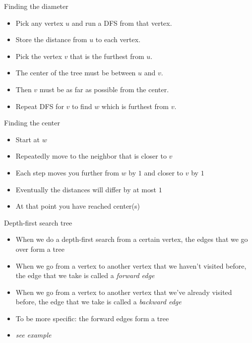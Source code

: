 \documentclass{beamer}
\begin{document}
\begin{frame}[plain]{Finding the diameter}
    \begin{itemize}
        \item Pick any vertex $u$ and run a DFS from that vertex.
        \item Store the distance from $u$ to each vertex.
        \item Pick the vertex $v$ that is the furthest from $u$.
        \item The center of the tree must be between $u$ and $v$.
        \item Then $v$ must be as far as possible from the center.
        \item Repeat DFS for $v$ to find $w$ which is furthest from $v$.
    \end{itemize}
\end{frame}

\begin{frame}[plain]{Finding the center}
    \begin{itemize}
        \item Start at $w$
        \item Repeatedly move to the neighbor that is closer to $v$
        \item Each step moves you further from $w$ by $1$ and closer to $v$ by $1$
        \item Eventually the distances will differ by at most $1$
        \item At that point you have reached center(s)
    \end{itemize}
\end{frame}

\begin{frame}[plain]{Depth-first search tree}
    \vspace{30pt}

    \begin{itemize}
        \item When we do a depth-first search from a certain vertex, the edges
            that we go over form a tree
        \item When we go from a vertex to another vertex that we haven't visited before, the edge that we take is called a \textit{forward edge}
        \item When we go from a vertex to another vertex that we've already visited before, the edge that we take is called a \textit{backward edge}
        \item To be more specific: the forward edges form a tree
        \vspace{20pt}
        \item \textit{see example}
    \end{itemize}
\end{frame}
\end{document}
